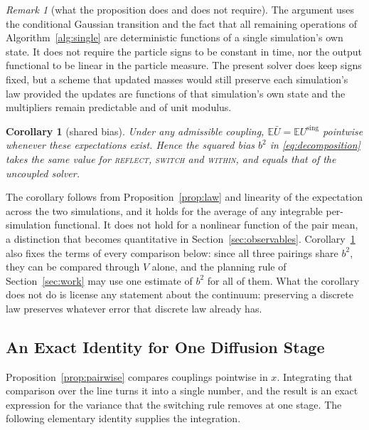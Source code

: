 \documentclass[smallextended,nospthms]{svjour3}
\theoremstyle{plain}
\newtheorem{corollary}[proposition]{Corollary}
\theoremstyle{definition}
\theoremstyle{remark}
\newtheorem{remark}[proposition]{Remark}
\numberwithin{equation}{section}
\newcommand{\E}{\mathbb{E}}
\newcommand{\refl}{\textnormal{\textsc{reflect}}}
\newcommand{\swi}{\textnormal{\textsc{switch}}}
\newcommand{\wit}{\textnormal{\textsc{within}}}
\begin{document}
\begin{remark}[what the proposition does and does not require]
\label{rem:hyp}
The argument uses the conditional Gaussian transition and the fact that all
remaining operations of Algorithm~\ref{alg:single} are deterministic functions
of a single simulation's own state. It does not require the particle signs to
be constant in time, nor the output functional to be linear in the particle
measure. The present solver does keep signs fixed, but a scheme that updated
masses would still preserve each simulation's law provided the updates are
functions of that simulation's own state and the multipliers remain predictable
and of unit modulus.
\end{remark}

\begin{corollary}[shared bias]
\label{cor:bias}
Under any admissible coupling, $\E\bar U=\E U^{\mathrm{sing}}$ pointwise
whenever these expectations exist. Hence the squared bias $b^2$ in
\eqref{eq:decomposition} takes the same value for \refl{}, \swi{} and \wit{},
and equals that of the uncoupled solver.
\end{corollary}

The corollary follows from Proposition~\ref{prop:law} and linearity of the
expectation across the two simulations, and it holds for the average of any
integrable per-simulation functional. It does not hold for a nonlinear function
of the pair mean, a distinction that becomes quantitative in
Section~\ref{sec:observables}. Corollary~\ref{cor:bias} also fixes the terms of
every comparison below: since all three pairings share $b^2$, they can be
compared through $V$ alone, and the planning rule of Section~\ref{sec:work} may
use one estimate of $b^2$ for all of them. What the corollary does not do is
license any statement about the continuum: preserving a discrete law preserves
whatever error that discrete law already has.

\subsection{An Exact Identity for One Diffusion Stage}
\label{sec:identity}

Proposition~\ref{prop:pairwise} compares couplings pointwise in $x$. Integrating
that comparison over the line turns it into a single number, and the result is
an exact expression for the variance that the switching rule removes at one
stage. The following elementary identity supplies the integration.
\end{document}
